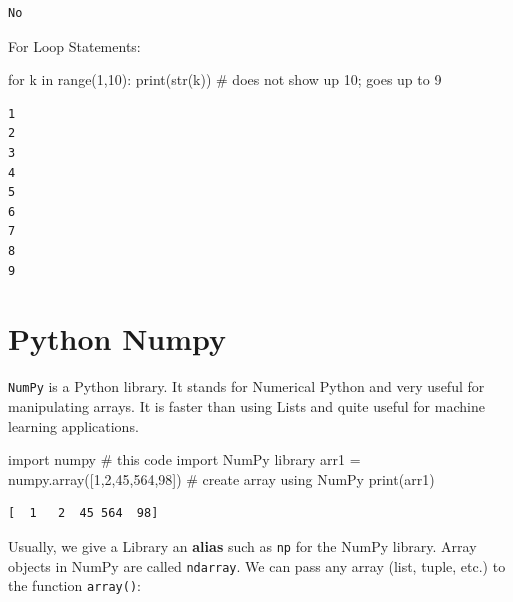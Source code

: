 \documentclass[
  letterpaper,
  DIV=11,
  numbers=noendperiod]{scrreprt}
\newenvironment{Shaded}{\begin{snugshade}}{\end{snugshade}}
\newcommand{\BuiltInTok}[1]{\textcolor[rgb]{0.00,0.23,0.31}{#1}}
\newcommand{\CommentTok}[1]{\textcolor[rgb]{0.37,0.37,0.37}{#1}}
\newcommand{\ControlFlowTok}[1]{\textcolor[rgb]{0.00,0.23,0.31}{#1}}
\newcommand{\DecValTok}[1]{\textcolor[rgb]{0.68,0.00,0.00}{#1}}
\newcommand{\ImportTok}[1]{\textcolor[rgb]{0.00,0.46,0.62}{#1}}
\newcommand{\KeywordTok}[1]{\textcolor[rgb]{0.00,0.23,0.31}{#1}}
\newcommand{\NormalTok}[1]{\textcolor[rgb]{0.00,0.23,0.31}{#1}}
\newcommand{\OperatorTok}[1]{\textcolor[rgb]{0.37,0.37,0.37}{#1}}
\begin{document}
\begin{verbatim}
No
\end{verbatim}

For Loop Statements:

\begin{Shaded}
\begin{Highlighting}[]
\ControlFlowTok{for}\NormalTok{ k }\KeywordTok{in} \BuiltInTok{range}\NormalTok{(}\DecValTok{1}\NormalTok{,}\DecValTok{10}\NormalTok{): }
  \BuiltInTok{print}\NormalTok{(}\BuiltInTok{str}\NormalTok{(k)) }\CommentTok{\# does not show up 10; goes up to 9}
\end{Highlighting}
\end{Shaded}

\begin{verbatim}
1
2
3
4
5
6
7
8
9
\end{verbatim}

\hypertarget{python-numpy}{%
\section*{Python Numpy}\label{python-numpy}}


\texttt{NumPy} is a Python library. It stands for Numerical Python and
very useful for manipulating arrays. It is faster than using Lists and
quite useful for machine learning applications.

\begin{Shaded}
\begin{Highlighting}[]
\ImportTok{import}\NormalTok{ numpy }\CommentTok{\# this code import NumPy library}
\NormalTok{arr1 }\OperatorTok{=}\NormalTok{  numpy.array([}\DecValTok{1}\NormalTok{,}\DecValTok{2}\NormalTok{,}\DecValTok{45}\NormalTok{,}\DecValTok{564}\NormalTok{,}\DecValTok{98}\NormalTok{]) }\CommentTok{\# create array using NumPy}
\BuiltInTok{print}\NormalTok{(arr1)}
\end{Highlighting}
\end{Shaded}

\begin{verbatim}
[  1   2  45 564  98]
\end{verbatim}

Usually, we give a Library an \textbf{alias} such as \texttt{np} for the
NumPy library. Array objects in NumPy are called \texttt{ndarray}. We
can pass any array (list, tuple, etc.) to the function \texttt{array()}:
\end{document}
